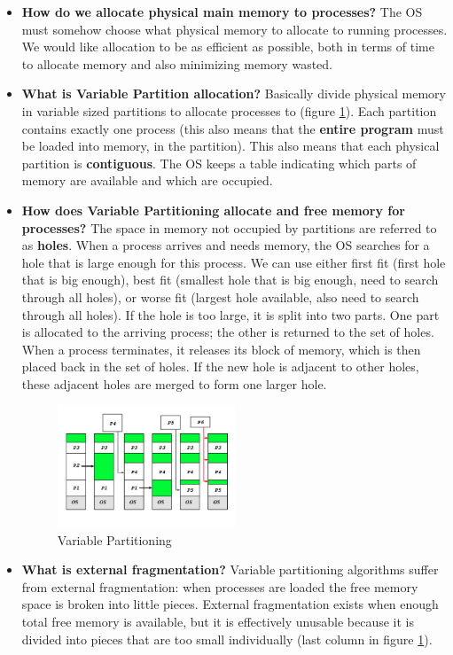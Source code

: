 \documentclass[12pt]{article}
\begin{document}
\begin{itemize}
    \item \textbf{How do we allocate physical main memory to processes?} The OS must somehow choose what physical memory to allocate to running processes. We would like allocation to be as efficient as possible, both in terms of time to allocate memory and also minimizing memory wasted.
    \item \textbf{What is Variable Partition allocation?} Basically divide physical memory in variable sized partitions to allocate processes to (figure \ref{fig:variable-partitioning}). Each partition contains exactly one process (this also means that the \textbf{entire program} must be loaded into memory, in the partition). This also means that each physical partition is \textbf{contiguous}. The OS keeps a table indicating which parts of memory are available and which are occupied.
    \item \textbf{How does Variable Partitioning allocate and free memory for processes?} The space in memory not occupied by partitions are referred to as \textbf{holes}. When a process arrives and needs memory, the OS searches for a hole that is large enough for this process. We can use either first fit (first hole that is big enough), best fit (smallest hole that is big enough, need to search through all holes), or worse fit (largest hole available, also need to search through all holes). If the hole is too large, it is split into two parts. One part is allocated to the arriving process; the other is returned to the set of holes. When a process terminates, it releases its block of memory, which is then placed back in the set of holes. If the new hole is adjacent to other holes, these adjacent holes are merged to form one larger hole.
        \begin{figure}[ht]
            \centering
            \includegraphics[width=0.5\textwidth]{figures/variable-partitioning.jpg}
            \caption{Variable Partitioning}
            \label{fig:variable-partitioning}
        \end{figure}
    \item \textbf{What is external fragmentation?} Variable partitioning algorithms suffer from external fragmentation: when processes are loaded the free memory space is broken into little pieces. External fragmentation exists when enough total free memory is available, but it is effectively unusable because it is divided into pieces that are too small individually (last column in figure \ref{fig:variable-partitioning}).

\end{itemize}
\end{document}
